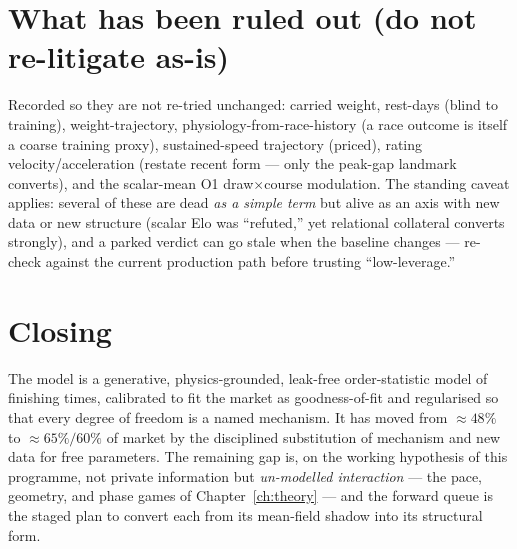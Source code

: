 \section{What has been ruled out (do not re-litigate as-is)}

Recorded so they are not re-tried unchanged: carried weight, rest-days (blind to training),
weight-trajectory, physiology-from-race-history (a race outcome is itself a coarse training proxy),
sustained-speed trajectory (priced), rating velocity/acceleration (restate recent form --- only the
peak-gap landmark converts), and the scalar-mean O1 draw$\times$course modulation. The standing
caveat applies: several of these are dead \emph{as a simple term} but alive as an axis with new data
or new structure (scalar Elo was ``refuted,'' yet relational collateral converts strongly), and a
parked verdict can go stale when the baseline changes --- re-check against the current production
path before trusting ``low-leverage.''

\section{Closing}

The model is a generative, physics-grounded, leak-free order-statistic model of finishing times,
calibrated to fit the market as goodness-of-fit and regularised so that every degree of freedom is a
named mechanism. It has moved from $\approx 48\%$ to $\approx 65\%/60\%$ of market by the disciplined
substitution of mechanism and new data for free parameters. The remaining gap is, on the working
hypothesis of this programme, not private information but \emph{un-modelled interaction} --- the
pace, geometry, and phase games of Chapter~\ref{ch:theory} --- and the forward queue is the staged
plan to convert each from its mean-field shadow into its structural form.
